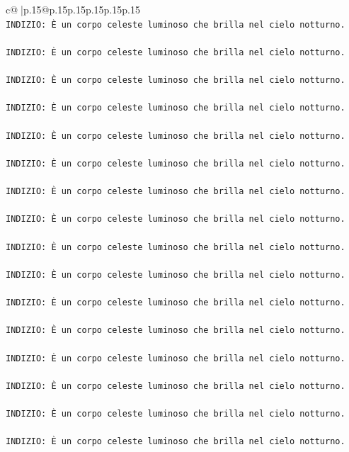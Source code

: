 \documentclass{article}
\begin{document}
{\begin{supertabular}{c@{$\;$}|p{.15\linewidth}@{}p{.15\linewidth}p{.15\linewidth}p{.15\linewidth}p{.15\linewidth}p{.15\linewidth}}
{{{\\ 
\texttt{INDIZIO: È un corpo celeste luminoso che brilla nel cielo notturno.} \\
\\ 
\texttt{INDIZIO: È un corpo celeste luminoso che brilla nel cielo notturno.} \\
\\ 
\texttt{INDIZIO: È un corpo celeste luminoso che brilla nel cielo notturno.} \\
\\ 
\texttt{INDIZIO: È un corpo celeste luminoso che brilla nel cielo notturno.} \\
\\ 
\texttt{INDIZIO: È un corpo celeste luminoso che brilla nel cielo notturno.} \\
\\ 
\texttt{INDIZIO: È un corpo celeste luminoso che brilla nel cielo notturno.} \\
\\ 
\texttt{INDIZIO: È un corpo celeste luminoso che brilla nel cielo notturno.} \\
\\ 
\texttt{INDIZIO: È un corpo celeste luminoso che brilla nel cielo notturno.} \\
\\ 
\texttt{INDIZIO: È un corpo celeste luminoso che brilla nel cielo notturno.} \\
\\ 
\texttt{INDIZIO: È un corpo celeste luminoso che brilla nel cielo notturno.} \\
\\ 
\texttt{INDIZIO: È un corpo celeste luminoso che brilla nel cielo notturno.} \\
\\ 
\texttt{INDIZIO: È un corpo celeste luminoso che brilla nel cielo notturno.} \\
\\ 
\texttt{INDIZIO: È un corpo celeste luminoso che brilla nel cielo notturno.} \\
\\ 
\texttt{INDIZIO: È un corpo celeste luminoso che brilla nel cielo notturno.} \\
\\ 
\texttt{INDIZIO: È un corpo celeste luminoso che brilla nel cielo notturno.} \\
\\ 
\texttt{INDIZIO: È un corpo celeste luminoso che brilla nel cielo notturno.} \\
}}}
\end{supertabular}}
\end{document}
